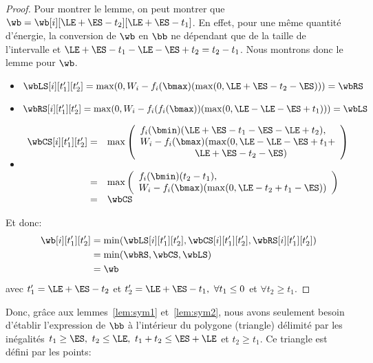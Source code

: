 \begin{proof}
Pour montrer le lemme, on peut montrer que $ \wb=
\wb[i][\LE+\ES-t_2][\LE +\ES -t_1]$. En effet, pour une même quantité
d'énergie, la conversion de $\wb$ en $\bb$ ne dépendant que de la
taille de l'intervalle et $\LE +\ES -t_1 - \LE - \ES+t_2 =t_2 -
t_1$. Nous montrons donc le lemme pour $\wb$.

  \begin{itemize}
  \item $\wbLS[i][t_1'][t_2']=\max(0,W_i-f_i(\bmax)(\max(0,\LE+\ES-t_2-\ES)))=\wbRS$
    \vspace{0.2cm}
  \item $\wbRS[i][t_1'][t_2']=\max(0,W_i-f_i(f_i(\bmax))(\max(0,\LE-\LE-\ES+t_1)))=\wbLS$
  \item$
    \begin{array}{rl}
      \wbCS[i][t_1'][t_2']=&\max\left(
      \begin{array}{l}
	f_i(\bmin) (\LE+\ES-t_1 - \ES- \LE + t_2),\\
	W_i - f_i(\bmax)(\max(0,\LE - \LE -\ES +t_1+\\
        \hspace{2cm}\LE +\ES - t_2 - \ES)
      \end{array}
      \right)\\
      & \\
      = &\max\left(
      \begin{array}{l}
	f_i(\bmin) (t_2-t_1),\\
	W_i - f_i(\bmax)(\max(0,\LE-t_2 +t_1 - \ES))
      \end{array}
	\right)\\
      = & \wbCS
    \end{array}$
  \end{itemize}
  Et donc: 
\begin{align*}
\wb[i][t_1'][t_2'] &=
                     \min(\wbLS[i][t_1'][t_2'],\wbCS[i][t_1'][t_2'],\wbRS[i][t_1'][t_2'])
                     \\
 & =\min(\wbRS,\wbCS,\wbLS)\\
 & =\wb 
\end{align*}
avec $t_1'=\LE+\ES-t_2$ et
$t_2'=\LE+\ES-t_1,\ \forall t_1 \le 0$ et $\forall t_2 \ge t_1$.
\end{proof}

Donc, grâce aux lemmes~\ref{lem:sym1} et~\ref{lem:sym2}, nous avons
seulement besoin d'établir l'expression de $\bb$ à l'intérieur du
polygone (triangle) délimité par les inégalités $t_1 \ge \ES, \ t_2
\le \LE,\ t_1+t_2 \le \ES+\LE$ et $ t_2 \ge t_1$. Ce triangle est
défini par les points:


